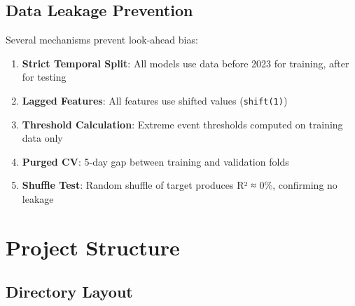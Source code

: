 \documentclass[12pt,a4paper]{article}
\begin{document}
\subsection{Data Leakage Prevention}

Several mechanisms prevent look-ahead bias:

\begin{enumerate}
    \item \textbf{Strict Temporal Split}: All models use data before 2023 for training, after for testing
    \item \textbf{Lagged Features}: All features use shifted values (\texttt{shift(1)})
    \item \textbf{Threshold Calculation}: Extreme event thresholds computed on training data only
    \item \textbf{Purged CV}: 5-day gap between training and validation folds
    \item \textbf{Shuffle Test}: Random shuffle of target produces R² ≈ 0\%, confirming no leakage
\end{enumerate}

\section{Project Structure}

\subsection{Directory Layout}
\end{document}
